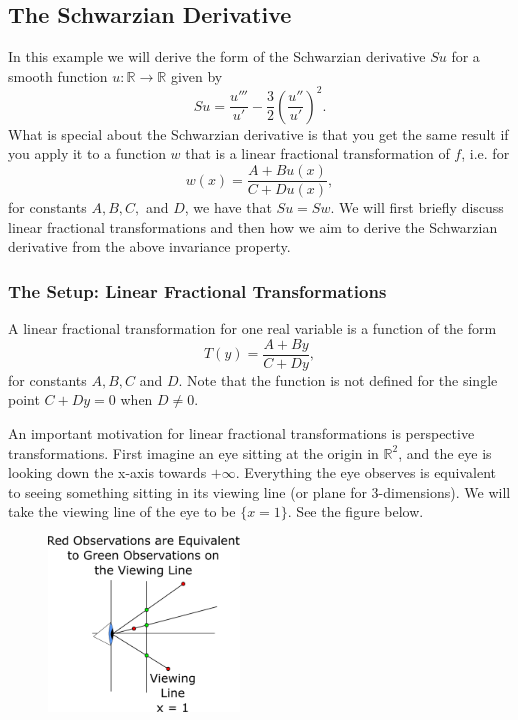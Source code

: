 \subsection{The Schwarzian Derivative}

In this example we will derive the form of the Schwarzian derivative \(Su\) for a smooth function \(u:\mathbb R \to \mathbb R\)
given by
\begin{equation}
Su = \frac{u'''}{u'} - \frac{3}{2}\left(\frac{u''}{u'}\right)^2.
\end{equation}
What is special about the Schwarzian derivative is that you get the same result if you apply it to
a function \(w\) that is a linear fractional transformation of \(f\), i.e. for
\begin{equation}
w(x) = \frac{A + Bu(x)}{C + Du(x)},
\end{equation}
for constants \(A, B, C,\) and \(D\), we have that \(Su = Sw\). We will first briefly discuss 
linear fractional transformations and then how we aim to derive the Schwarzian derivative from the
above invariance property.

\subsubsection*{The Setup: Linear Fractional Transformations}

A linear fractional transformation for one real variable is a function of the form
\begin{equation}
T(y) = \frac{A + By}{C + Dy},
\end{equation}
for constants \(A, B, C\) and \(D\). Note that the function is not defined for the single point \(C + Dy = 0\) when
\(D\neq 0\).

An important motivation for linear fractional transformations is perspective transformations. First imagine an
eye sitting at the origin in \(\mathbb R^2\), and the eye is looking down the x-axis towards \(+\infty\). 
Everything the eye
observes is equivalent to seeing something sitting in its viewing line (or plane for 3-dimensions). We will
take the viewing line of the eye to be \(\{x = 1\}\). See the figure below.

\begin{figure}[h]
\centering
\includegraphics[width = 2in]{oneVarDiffCalc/perspective1.pdf}
\end{figure}

